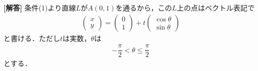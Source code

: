 \documentclass[../../main.tex]{subfiles}
\begin{document}
\begin{oframed}
  
\end{oframed}

{\bf [解答]}
条件(1)より直線$L$が$A(0,1)$を通るから，この$L$上の点はベクトル表記で
\begin{align}
  \begin{pmatrix}
    x \\
    y
  \end{pmatrix}
  =
  \begin{pmatrix}
    0 \\
    1
  \end{pmatrix}
  + t
  \begin{pmatrix}
    \cos \theta \\
    \sin \theta
  \end{pmatrix} \label{eq:1}
\end{align}
と書ける．ただし$t$は実数，$\theta$は
\begin{align}
  -\dfrac{\pi}{2} < \theta \le \dfrac{\pi}{2} \label{eq:2}
\end{align}
とする．
\end{document}
